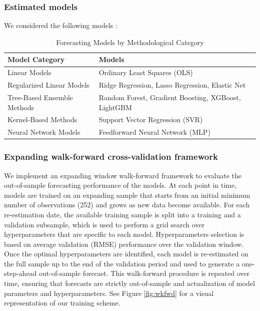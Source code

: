 \documentclass{article}
\begin{document}
\subsubsection{Estimated models}

We considered the following models :

\begin{table}[ht]
\centering
\caption{Forecasting Models by Methodological Category}
\label{tab:models}
\begin{tabular}{ll}
\hline
\textbf{Model Category} & \textbf{Models} \\
\hline
Linear Models
& Ordinary Least Squares (OLS) \\

Regularized Linear Models
& Ridge Regression, Lasso Regression, Elastic Net \\

Tree-Based Ensemble Methods
& Random Forest, Gradient Boosting, XGBoost, LightGBM \\

Kernel-Based Methods
& Support Vector Regression (SVR) \\

Neural Network Models
& Feedforward Neural Network (MLP) \\

\hline
\end{tabular}
\end{table}



\subsubsection{Expanding walk-forward cross-validation framework}

We implement an expanding window walk-forward framework to evaluate the out-of-sample forecasting performance of the models. At each point in time, models are trained on an expanding sample that starts from an initial minimum number of observations (252) and grows as new data become available. For each re-estimation date, the available training sample is split into a training and a validation subsample, which is used to perform a grid search over hyperparameters that are specific to each model. Hyperparameters selection is based on average validation (RMSE) performance over the validation window. Once the optimal hyperparameters are identified, each model is re-estimated on the full sample up to the end of the validation period and used to generate a one-step-ahead out-of-sample forecast. This walk-forward procedure is repeated over time, ensuring that forecasts are strictly out-of-sample and actualization of model parameters and hyperparameters. See Figure \ref{fig:wkfwd} for a visual representation of our training scheme.
\end{document}
